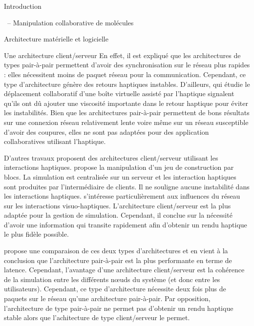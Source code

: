 \documentclass[myfrancais]{mythesis}
\begin{document}
\begin{mypart}{Introduction}
\begin{mychapter}{\myShaddock\ -- Manipulation collaborative de molécules}
\begin{mysection}{Architecture matérielle et logicielle}
\begin{mysubsection}{Une architecture client/serveur}
					En effet, il est expliqué que les architectures de types pair-à-pair permettent d'avoir des synchronisation sur le réseau plus rapides : elles nécessitent moins de paquet réseau pour la communication.
					Cependant, ce type d'architecture génère des retours haptiques instables.
					D'ailleurs,  qui étudie le déplacement collaboratif d'une boîte virtuelle assisté par l'haptique signalent qu'ils ont dû ajouter une viscosité importante dans le retour haptique pour éviter les instabilités.
					Bien que les architectures pair-à-pair permettent de bons résultats sur une connexion réseau relativement lente voire même sur un réseau susceptible d'avoir des coupures, elles ne sont pas adaptées pour des application collaboratives utilisant l'haptique.
					
					D'autres travaux proposent des architectures client/serveur utilisant les interactions haptiques.
					 propose la manipulation d'un jeu de construction par blocs.
					La simulation est centralisée sur un serveur et les interaction haptiques sont produites par l'intermédiaire de clients.
					Il ne souligne aucune instabilité dans les interactions haptiques.
					 s'intéresse particulièrement aux influences du réseau sur les interactions visuo-haptiques.
					L'architecture client/serveur est la plus adaptée pour la gestion de simulation.
					Cependant, il conclue sur la nécessité d'avoir une information qui transite rapidement afin d'obtenir un rendu haptique le plus fidèle possible.

					 propose une comparaison de ces deux types d'architectures et en vient à la conclusion que l'architecture pair-à-pair est la plus performante en terme de latence.
					Cependant, l'avantage d'une architecture client/serveur est la cohérence de la simulation entre les différents nœuds du système (et donc entre les utilisateurs).
					Cependant, ce type d'architecture nécessite deux fois plus de paquets sur le réseau qu'une architecture pair-à-pair.
					Par opposition, l'architecture de type pair-à-pair ne permet pas d'obtenir un rendu haptique stable alors que l'achitecture de type client/serveur le permet.


\end{mysubsection}
\end{mysection}
\end{mychapter}
\end{mypart}
\end{document}
